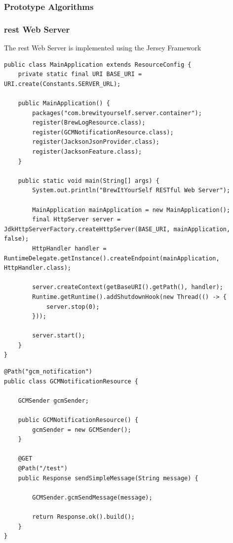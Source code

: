 \documentclass{article}
\begin{document}
\subsubsection{Prototype Algorithms}

\subsubsection{\gls{rest} Web Server}
The \gls{rest} Web Server is implemented using the Jersey Framework

\begin{lstlisting}
public class MainApplication extends ResourceConfig {
    private static final URI BASE_URI = URI.create(Constants.SERVER_URL);

    public MainApplication() {
        packages("com.brewityourself.server.container");
        register(BrewLogResource.class);
        register(GCMNotificationResource.class);
        register(JacksonJsonProvider.class);
        register(JacksonFeature.class);
    }

    public static void main(String[] args) {
        System.out.println("BrewItYourSelf RESTful Web Server");

        MainApplication mainApplication = new MainApplication();
        final HttpServer server = JdkHttpServerFactory.createHttpServer(BASE_URI, mainApplication, false);
        HttpHandler handler = RuntimeDelegate.getInstance().createEndpoint(mainApplication, HttpHandler.class);

        server.createContext(getBaseURI().getPath(), handler);
        Runtime.getRuntime().addShutdownHook(new Thread(() -> {
            server.stop(0);
        }));

        server.start();
    }
}
\end{lstlisting}

\begin{lstlisting}
@Path("gcm_notification")
public class GCMNotificationResource {

    GCMSender gcmSender;

    public GCMNotificationResource() {
        gcmSender = new GCMSender();
    }

    @GET
    @Path("/test")
    public Response sendSimpleMessage(String message) {

        GCMSender.gcmSendMessage(message);

        return Response.ok().build();
    }
}
\end{lstlisting}
\begin{lstlisting}

\end{lstlisting}
\end{document}
